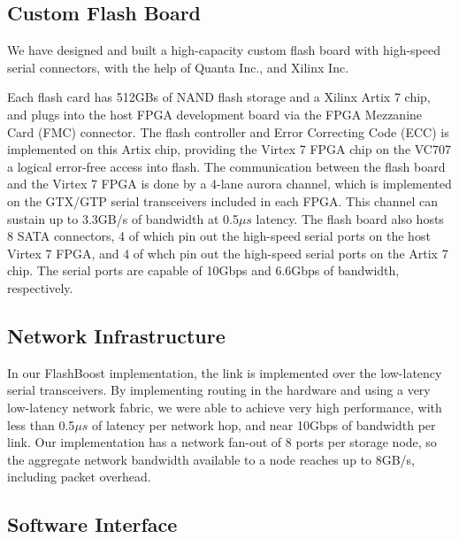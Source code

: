 \subsection{Custom Flash Board}


We have designed and built a high-capacity custom flash board with high-speed
serial connectors, with the help of Quanta Inc., and Xilinx Inc.

Each flash card has 512GBs of NAND flash storage and a Xilinx Artix 7 chip, and
plugs into the host FPGA development board via the FPGA Mezzanine Card (FMC)
connector. The flash controller and Error Correcting Code (ECC) is implemented
on this Artix chip, providing the Virtex 7 FPGA chip on the VC707 a logical
error-free access into flash. The communication between the flash board and the
Virtex 7 FPGA is done by a 4-lane aurora channel, which is implemented on the
GTX/GTP serial transceivers included in each FPGA. This channel can sustain up
to 3.3GB/s of bandwidth at 0.5$\mu s$ latency.
The flash board also hosts 8 SATA connectors, 4 of
which pin out the high-speed serial ports on the host Virtex 7 FPGA,
and 4 of whch pin out the high-speed serial ports on the Artix 7 chip.
The serial ports are capable of 10Gbps and 6.6Gbps of bandwidth, respectively.

\subsection{Network Infrastructure}

In our FlashBoost implementation, the link is implemented over the
low-latency serial transceivers.  By
implementing routing in the hardware and using a very low-latency network
fabric, we were able to achieve very high performance, with less than 0.5$\mu s$ of
latency per network hop, and near 10Gbps of bandwidth per link. Our
implementation has a network fan-out of 8 ports per storage node, so the
aggregate network bandwidth available to a node reaches up to 8GB/s, including
packet overhead.

\subsection{Software Interface}

